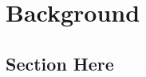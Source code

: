 \let\textcircled=\pgftextcircled
\chapter{Background}

\label{chap:background}
\section{Section Here}




